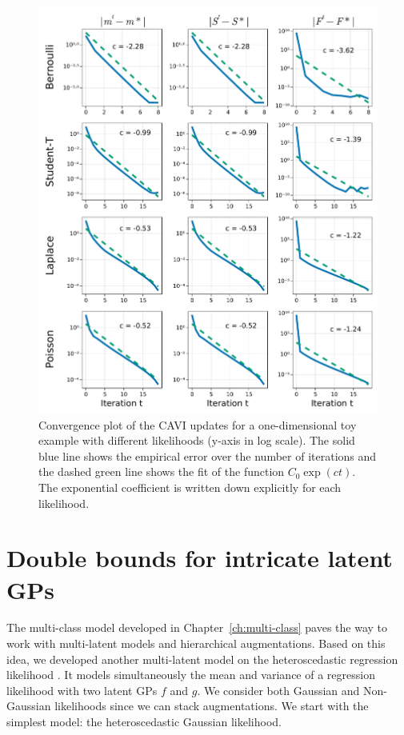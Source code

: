\begin{figure}[H]
\centering
\includegraphics[width=\textwidth]{./chapters/8_discussions/figures/convergence.pdf}
\caption{Convergence plot of the \ac{CAVI} updates for a one-dimensional toy example with different likelihoods (y-axis in log scale).
The solid blue line shows the empirical error over the number of iterations and the dashed green line shows the fit of the function $C_0 \exp(c t)$.
The exponential coefficient is written down explicitly for each likelihood.}
\label{fig:convergence}
\end{figure}


\section{Double bounds for intricate latent \acsp{GP}}
\label{sec:heteroscedastic}
The multi-class model developed in Chapter~\ref{ch:multi-class} paves the way to work with multi-latent models and hierarchical augmentations.
Based on this idea, we developed another multi-latent model on the heteroscedastic regression likelihood  \cite{wangGaussianProcessRegression2012,lazaro2011variational}.
It models simultaneously the mean and variance of a regression likelihood with two latent \acp{GP} $f$ and $g$.
We consider both Gaussian and Non-Gaussian likelihoods since we can stack augmentations.
We start with the simplest model: the heteroscedastic Gaussian likelihood.

